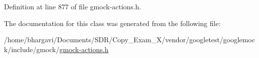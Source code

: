 Definition at line 877 of file gmock-\/actions.\+h.



The documentation for this class was generated from the following file\+:\begin{DoxyCompactItemize}
\item 
/home/bhargavi/\+Documents/\+S\+D\+R/\+Copy\+\_\+\+Exam\+\_\+X/vendor/googletest/googlemock/include/gmock/\hyperlink{gmock-actions_8h}{gmock-\/actions.\+h}\end{DoxyCompactItemize}
